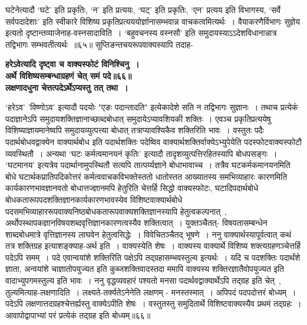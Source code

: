 {{{{ घटेनेत्यादौ `घटे' इति प्रकृतिः, `न' इति प्रत्ययः, `घट्' इति प्रकृतिः, `एन' प्रत्यय इति विभागस्य, `सर्वे सर्वपदादेशाः' इति स्वीकारे विशिष्य प्रकृतिप्रत्यययोर्ज्ञानासम्भवान्न वाचकत्वमित्यर्थः~।
वैयाकरणैर्विभागः सुज्ञेय इत्यतो दृष्टान्तव्याजेनाह-वस्नसादाविति~।
`बहुवचनस्य वस्नसौ' इति समुदायस्याऽऽदेशविधानान्नात्र तद्विभागः सम्भवतीत्यर्थः~॥६५॥
सुप्तिङन्तचयरूपवाक्यस्यापि तदाह-

\begin{center}{\bfseries हरेऽवेत्यादि दृष्ट्वा च वाक्यस्फोटं विनिश्चिनु~।\\[10pt]
अर्थे विशिष्यसम्बन्धाग्रहणं चेत् समं पदे॥६६॥\\
 लक्षणादधुना चेत्तत्पदेऽर्थेऽप्यस्तु तत् तथा~।}\end{center}

 `हरेऽव' 'विष्णोऽव' इत्यादौ पदयोः "एङः पदान्तादति" इत्येकादेशे सति न तद्विभागः सुज्ञानः~।
तथाच प्रत्येकं पदाज्ञानेऽपि समुदायशक्तिज्ञानाच्छाब्दबोधात् समुदायेऽप्यावशियकी शक्तिः~।
एवञ्च प्रकृतिप्रत्ययेषु विशिष्याज्ञायमानेष्वपि समुदायव्युत्पत्त्या बोधात् तत्राप्यावश्यिकैव शक्तिरिति भावः~।
वस्तुतः पदैः पदार्थबोधवद्वाक्येन वाक्यार्थबोध इति पदार्थशक्तिः पदेष्विव वाक्यार्थशक्तिर्वाक्येऽभ्युपेयेति पदस्फोटवाक्यस्फोटौ व्यवस्थितौ~।
अन्यथा `घटः कर्मत्वमानयनं कृतिः' इत्यादौ तादृशव्युत्पत्तिरहितस्यापि बोधपसङ्गः~।
`घटमानय' इत्यत्रेव पदार्थानामुपस्थितौ सत्यपि तात्पर्य्यज्ञाने बोधाभावाच्च~।
तत्रैव घटकर्मकमानयनमिति बोधे घटार्थकप्रातिपदिकोत्तरं कर्मत्ववाचकविभक्तेस्ततो धातोस्तत आख्यातस्य समभिव्याहारः कारणमिति कार्यकारणभावज्ञानवतो बोधात्तज्ज्ञानमपि हेतुरिति चेत्तर्हि सिद्धो वाक्यस्फोटः, घटादिपदार्थबोधे बोधकतारूपपदशक्तिज्ञानकार्यकारणभावस्येव विशिष्टवाक्यार्थबोधे पदसमभिव्याहाररूपवाक्यनिष्ठबोधकतारूपवाक्यशक्तिज्ञानस्यापि हेतुत्वकल्पनात्~, अर्थोपस्थापकज्ञानविषयशब्दवृत्तिज्ञानकारणत्वस्यैव शक्तित्वात्~।
 युक्तञ्चैतत्- विषयतासम्बन्धेन शाब्दबोधमात्रे वृत्तिज्ञानस्य लाघवेन हेतुत्वसिद्धेः~।
विवेचितञ्चैतद् भूषणे~।
 ननु वाक्यार्थस्यापूर्वत्वात् कथं तत्र शक्तिग्रह इत्याशङ्क्याह-अर्थ इति~।
वाक्यस्येति शेषः~।
वाक्यस्य वाक्यार्थे विशिष्य शक्त्यग्रहणञ्चेत्तर्हि पदेऽपि समम्~।
पदे एवान्वयांशे शक्तिरिति पक्षेऽपि तद्ग्रहासम्भवस्तुल्य इत्यर्थः~।
यदि च पदशक्तिः पदार्थंशे ज्ञाता, अन्वयांशे चाज्ञातोपयुज्यत इति कुब्जशक्तिवादस्तदा ममापि वाक्यस्य शक्तिरज्ञातैवोपयुज्यत इति वादाभ्युपगमस्तुल्य इति भावः~।
ननु वृद्धव्यवहारं पश्यतो मनसा पदार्थवद्वाक्यार्थेऽपि तद्ग्रह इति चेत्~, तुल्यमित्याह-लक्षणादिति~।
लक्ष्यते-तर्क्यतेऽनेनेति लक्षणम् - मनस्तस्मात्~।
अपिपदं पदपदोत्तरं बोध्यम्~।
पदेऽपि लक्षणात्तदग्रहश्चेत्तर्ह्यस्तु वाक्येऽपीति शेषः~।
वस्तुतस्तु समुदितार्थे विशिष्टवाक्यस्यैव प्रथमं तद्ग्रहः~।
आवापोद्वापाभ्यां परं प्रत्येकं तद्ग्रह इति बोध्यम्॥६६॥

}}}}

